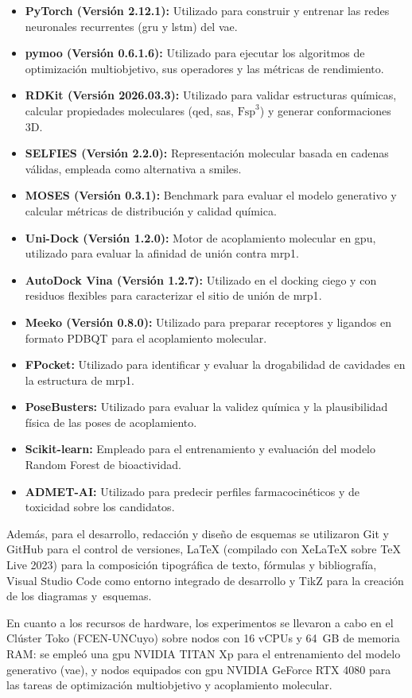\begin{itemize}
    \item \textbf{PyTorch (Versión 2.12.1):} Utilizado para construir y entrenar las redes neuronales recurrentes (\gls{gru} y \gls{lstm}) del \gls{vae}.
    \item \textbf{pymoo (Versión 0.6.1.6):} Utilizado para ejecutar los algoritmos de optimización multiobjetivo, sus operadores y las métricas de rendimiento.
    \item \textbf{RDKit (Versión 2026.03.3):} Utilizado para validar estructuras químicas, calcular propiedades moleculares (\gls{qed}, \gls{sas}, $\text{Fsp}^3$) y generar conformaciones 3D.
    \item \textbf{SELFIES (Versión 2.2.0):} Representación molecular basada en cadenas válidas, empleada como alternativa a \gls{smiles}.
    \item \textbf{MOSES (Versión 0.3.1):} Benchmark para evaluar el modelo generativo y calcular métricas de distribución y calidad química.
    \item \textbf{Uni-Dock (Versión 1.2.0):} Motor de acoplamiento molecular en \gls{gpu}, utilizado para evaluar la afinidad de unión contra \gls{mrp1}.
    \item \textbf{AutoDock Vina (Versión 1.2.7):} Utilizado en el docking ciego y con residuos flexibles para caracterizar el sitio de unión de \gls{mrp1}.
    \item \textbf{Meeko (Versión 0.8.0):} Utilizado para preparar receptores y ligandos en formato PDBQT para el acoplamiento molecular.
    \item \textbf{FPocket:} Utilizado para identificar y evaluar la drogabilidad de cavidades en la estructura de \gls{mrp1}.
    \item \textbf{PoseBusters:} Utilizado para evaluar la validez química y la plausibilidad física de las poses de acoplamiento.
    \item \textbf{Scikit-learn:} Empleado para el entrenamiento y evaluación del modelo Random Forest de bioactividad.
    \item \textbf{ADMET-AI:} Utilizado para predecir perfiles farmacocinéticos y de toxicidad sobre los candidatos.
\end{itemize}

Además, para el desarrollo, redacción y diseño de esquemas se utilizaron Git y GitHub para el control de versiones, LaTeX (compilado con XeLaTeX sobre TeX Live 2023) para la composición tipográfica de texto, fórmulas y bibliografía, Visual Studio Code como entorno integrado de desarrollo y TikZ para la creación de los diagramas y~esquemas.

En cuanto a los recursos de hardware, los experimentos se llevaron a cabo en el Clúster Toko (FCEN-UNCuyo) sobre nodos con 16 vCPUs y 64~GB de memoria RAM: se empleó una \gls{gpu} NVIDIA TITAN Xp para el entrenamiento del modelo generativo (\gls{vae}), y nodos equipados con \gls{gpu} NVIDIA GeForce RTX 4080 para las tareas de optimización multiobjetivo y acoplamiento molecular.
